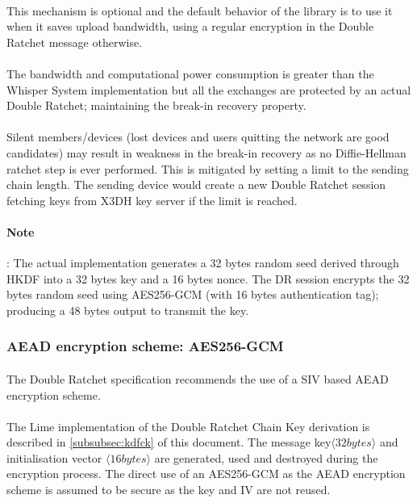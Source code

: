 \documentclass[a4paper,11pt]{article}
\begin{document}
    \paragraph{}This mechanism is optional and the default behavior of the library is to use it when it saves upload bandwidth, using a regular encryption in the Double Ratchet message otherwise.
    \paragraph{}The bandwidth and computational power consumption is greater than the Whisper System implementation but all the exchanges are protected by an actual Double Ratchet; maintaining the break-in recovery property.
    \paragraph{}Silent members/devices (lost devices and users quitting the network are good candidates) may result in weakness in the break-in recovery as no Diffie-Hellman ratchet step is ever performed. This is mitigated by setting a limit to the sending chain length. The sending device would create a new Double Ratchet session fetching keys from X3DH key server if the limit is reached.
    \paragraph{Note}: The actual implementation generates a 32 bytes random seed derived through HKDF\cite{rfc5869} into a 32 bytes key and a 16 bytes nonce. The DR session encrypts the 32 bytes random seed using AES256-GCM (with 16 bytes authentication tag); producing a 48 bytes output to transmit the key.
  
  \subsubsection{AEAD encryption scheme: AES256-GCM}
  \paragraph{}The Double Ratchet specification \cite[section 5.2]{doubleRatchet} recommends the use of a SIV based AEAD encryption scheme.
  \paragraph{}The Lime implementation of the Double Ratchet Chain Key derivation is described in \ref{subsubsec:kdfck} of this document. The message key$\langle 32 bytes\rangle$ and initialisation vector $\langle 16 bytes\rangle $ are generated, used and destroyed during the encryption process. The direct use of an AES256-GCM as the AEAD encryption scheme is assumed to be secure as the key and IV are not reused.
\end{document}
